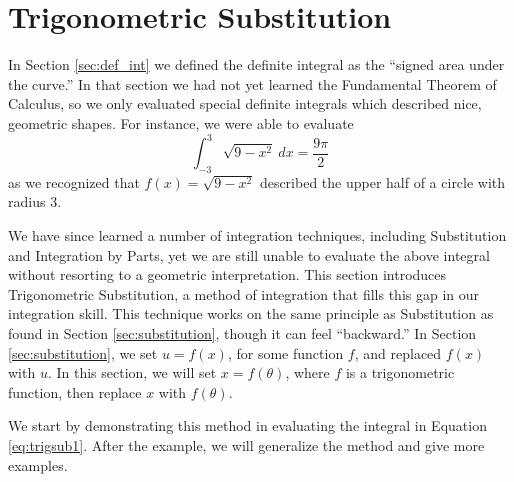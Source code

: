 \section{Trigonometric Substitution}\label{sec:trig_sub}

In Section \ref{sec:def_int} we defined the definite integral as the ``signed area under the curve.'' In that section we had not yet learned the Fundamental Theorem of Calculus, so we only evaluated special definite integrals which described nice, geometric shapes. For instance, we were able to evaluate
\begin{equation}
\int_{-3}^3\sqrt{9-x^2}\ dx = \frac{9\pi}{2}\label{eq:trigsub1}
\end{equation}
 as we recognized that $f(x) = \sqrt{9-x^2}$ described the upper half of a circle with radius 3. 

We have since learned a number of integration techniques, including Substitution and Integration by Parts, yet we are still unable to evaluate the above integral without resorting to a geometric interpretation. This section introduces Trigonometric Substitution, a method of integration that fills this gap in our integration skill. This technique works on the same principle as Substitution as found in Section \ref{sec:substitution}, though it can feel ``backward.'' In Section \ref{sec:substitution}, we set $u=f(x)$, for some function $f$, and replaced $f(x)$ with $u$. In this section, we will set $x=f(\theta)$, where $f$ is a trigonometric function, then replace $x$ with $f(\theta)$. 

We start by demonstrating this method in evaluating the integral in Equation \eqref{eq:trigsub1}. After the example, we will generalize the method and give more examples.\\
\enlargethispage{3\baselineskip}

